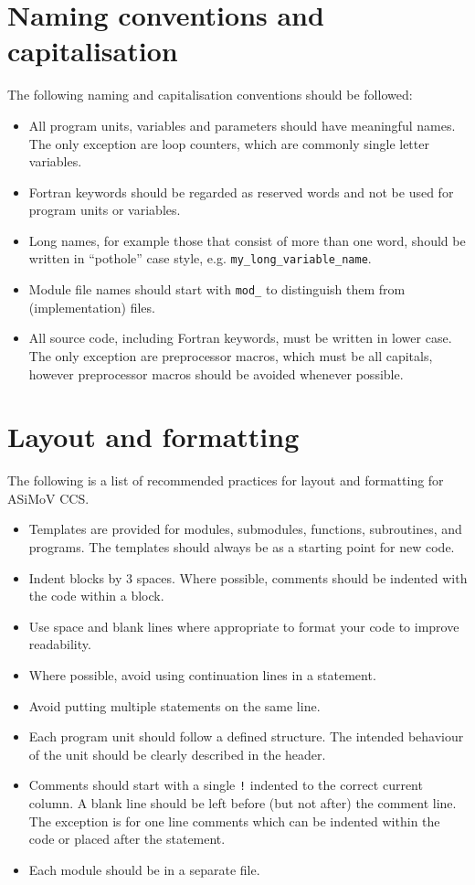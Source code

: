 \documentclass[11pt]{article}
\begin{document}
\section{Naming conventions and capitalisation}
The following naming and capitalisation conventions should be followed:
\begin{itemize}
  \item All program units, variables and parameters should have meaningful names. The only exception are loop counters, which
  are commonly single letter variables.
  \item Fortran keywords should be regarded as reserved words and not be used for program units or variables.
  \item Long names, for example those that consist of more than one word, 
  should be written in ``pothole'' case style, e.g. \texttt{my\_long\_variable\_name}.
  \item Module file names should start with \texttt{mod\_} to distinguish them from (implementation) files.
  \item All source code, including Fortran keywords, must be written in lower case. The only exception are preprocessor 
  macros, which must be all capitals, however preprocessor macros should be avoided whenever possible.
\end{itemize}

\section{Layout and formatting}
The following is a list of recommended practices for layout and formatting for ASiMoV CCS.

\begin{itemize}
\item Templates are provided for modules, submodules, functions, subroutines, and programs. The templates should always be as a 
starting point for new code.
\item Indent blocks by 3 spaces. Where possible, comments should be indented with the code within a block.
\item Use space and blank lines where appropriate to format your code to improve readability.
\item Where possible, avoid using continuation lines in a statement.
\item Avoid putting multiple statements on the same line.
\item Each program unit should follow a defined structure. The intended behaviour of the unit should be clearly described in the header.
\item Comments should start with a single \texttt{!} indented to the correct current column. A blank line should be left before (but not after) the 
comment line. The exception is for one line comments which can be indented within the code or placed after the statement.
\item Each module should be in a separate file.
\end{itemize}
\end{document}
